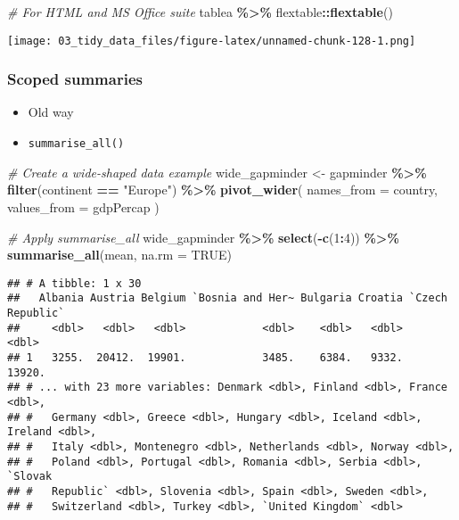 \documentclass[
]{book}
\newenvironment{Shaded}{\begin{snugshade}}{\end{snugshade}}
\newcommand{\CommentTok}[1]{\textcolor[rgb]{0.56,0.35,0.01}{\textit{#1}}}
\newcommand{\DataTypeTok}[1]{\textcolor[rgb]{0.13,0.29,0.53}{#1}}
\newcommand{\DecValTok}[1]{\textcolor[rgb]{0.00,0.00,0.81}{#1}}
\newcommand{\KeywordTok}[1]{\textcolor[rgb]{0.13,0.29,0.53}{\textbf{#1}}}
\newcommand{\NormalTok}[1]{#1}
\newcommand{\OperatorTok}[1]{\textcolor[rgb]{0.81,0.36,0.00}{\textbf{#1}}}
\newcommand{\OtherTok}[1]{\textcolor[rgb]{0.56,0.35,0.01}{#1}}
\newcommand{\StringTok}[1]{\textcolor[rgb]{0.31,0.60,0.02}{#1}}
\begin{document}
\begin{Shaded}
\begin{Highlighting}[]
\CommentTok{\# For HTML and MS Office suite}
\NormalTok{tablea }\OperatorTok{\%\textgreater{}\%}\StringTok{ }\NormalTok{flextable}\OperatorTok{::}\KeywordTok{flextable}\NormalTok{()}
\end{Highlighting}
\end{Shaded}

\texttt{[image: 03\_tidy\_data\_files/figure-latex/unnamed-chunk-128-1.png]}

\hypertarget{scoped-summaries}{%
\subsubsection{Scoped summaries}\label{scoped-summaries}}

\begin{itemize}
\item
  Old way
\item
  \texttt{summarise\_all()}
\end{itemize}

\begin{Shaded}
\begin{Highlighting}[]
\CommentTok{\# Create a wide{-}shaped data example}
\NormalTok{wide\_gapminder \textless{}{-}}\StringTok{ }\NormalTok{gapminder }\OperatorTok{\%\textgreater{}\%}
\StringTok{  }\KeywordTok{filter}\NormalTok{(continent }\OperatorTok{==}\StringTok{ "Europe"}\NormalTok{) }\OperatorTok{\%\textgreater{}\%}
\StringTok{  }\KeywordTok{pivot\_wider}\NormalTok{(}
    \DataTypeTok{names\_from =}\NormalTok{ country,}
    \DataTypeTok{values\_from =}\NormalTok{ gdpPercap}
\NormalTok{  )}

\CommentTok{\# Apply summarise\_all}
\NormalTok{wide\_gapminder }\OperatorTok{\%\textgreater{}\%}
\StringTok{  }\KeywordTok{select}\NormalTok{(}\OperatorTok{{-}}\KeywordTok{c}\NormalTok{(}\DecValTok{1}\OperatorTok{:}\DecValTok{4}\NormalTok{)) }\OperatorTok{\%\textgreater{}\%}
\StringTok{  }\KeywordTok{summarise\_all}\NormalTok{(mean, }\DataTypeTok{na.rm =} \OtherTok{TRUE}\NormalTok{)}
\end{Highlighting}
\end{Shaded}

\begin{verbatim}
## # A tibble: 1 x 30
##   Albania Austria Belgium `Bosnia and Her~ Bulgaria Croatia `Czech Republic`
##     <dbl>   <dbl>   <dbl>            <dbl>    <dbl>   <dbl>            <dbl>
## 1   3255.  20412.  19901.            3485.    6384.   9332.           13920.
## # ... with 23 more variables: Denmark <dbl>, Finland <dbl>, France <dbl>,
## #   Germany <dbl>, Greece <dbl>, Hungary <dbl>, Iceland <dbl>, Ireland <dbl>,
## #   Italy <dbl>, Montenegro <dbl>, Netherlands <dbl>, Norway <dbl>,
## #   Poland <dbl>, Portugal <dbl>, Romania <dbl>, Serbia <dbl>, `Slovak
## #   Republic` <dbl>, Slovenia <dbl>, Spain <dbl>, Sweden <dbl>,
## #   Switzerland <dbl>, Turkey <dbl>, `United Kingdom` <dbl>
\end{verbatim}
\end{document}
